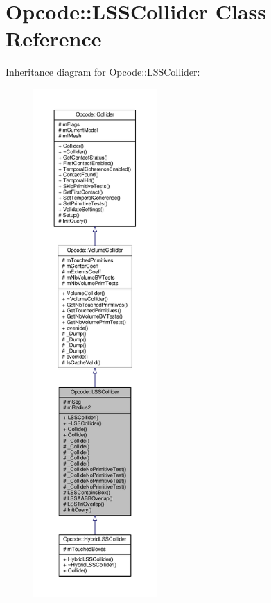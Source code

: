 \hypertarget{classOpcode_1_1LSSCollider}{}\section{Opcode\+:\+:L\+S\+S\+Collider Class Reference}
\label{classOpcode_1_1LSSCollider}


Inheritance diagram for Opcode\+:\+:L\+S\+S\+Collider\+:
\nopagebreak
\begin{figure}[H]
\begin{center}
\leavevmode
\includegraphics[height=550pt]{d1/dcd/classOpcode_1_1LSSCollider__inherit__graph}
\end{center}
\end{figure}


